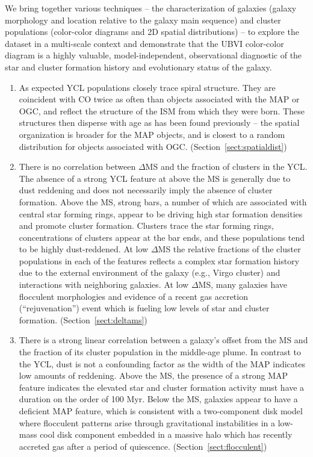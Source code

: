 \documentclass[linenumbers]{aastex63}
\begin{document}
We bring together various techniques -- the characterization of galaxies (galaxy morphology and location relative to the galaxy main sequence) and cluster populations (color-color diagrams and 2D spatial distributions) -- to explore the dataset in a multi-scale context and demonstrate that the UBVI color-color diagram is a highly valuable, model-independent, observational diagnostic of the star and cluster formation history and evolutionary status of the galaxy.
\begin{enumerate}
\item As expected YCL populations closely trace spiral structure.  They are coincident with CO twice as often than objects associated with the MAP or OGC, and reflect the structure of the ISM from which they were born. These structures then disperse with age as has been found previously -- the spatial organization is broader for the MAP objects, and is closest to a random distribution for objects associated with OGC.  {(Section~\ref{sect:spatialdist})}

\item There is no correlation between $\Delta$MS and the fraction of clusters in the YCL. The absence of a strong YCL feature at above the MS is generally due to dust reddening and does not necessarily imply the absence of cluster formation.  Above the MS, strong bars, a number of which are associated with central star forming rings, appear to be driving high star formation densities and promote cluster formation. Clusters trace the star forming rings, concentrations of clusters appear at the bar ends, and these populations tend to be highly dust-reddened.  At low $\Delta$MS the relative fractions of the cluster populations in each of the features reflects a complex star formation history due to the external environment of the galaxy (e.g., Virgo cluster) and interactions with neighboring galaxies.  At low $\Delta$MS, many galaxies have flocculent morphologies and evidence of a recent gas accretion (``rejuvenation'') event which is fueling low levels of star and cluster formation.  {(Section~\ref{sect:deltams})}
\item  There is a strong linear correlation between a galaxy's offset from the MS and the fraction of its cluster population in the middle-age plume.  In contrast to the YCL, dust is not a confounding factor as the width of the MAP indicates low amounts of reddening.  Above the MS, the presence of a strong MAP feature indicates the elevated star and cluster formation activity must have a duration on the order of 100 Myr.  Below the MS, galaxies appear to have a deficient MAP feature, which is consistent with a two-component disk model where flocculent patterns arise through gravitational instabilities in a low-mass cool disk component embedded in
a massive halo which has recently accreted gas after a period of quiescence.    {(Section~\ref{sect:flocculent})}




\end{enumerate}
\end{document}
